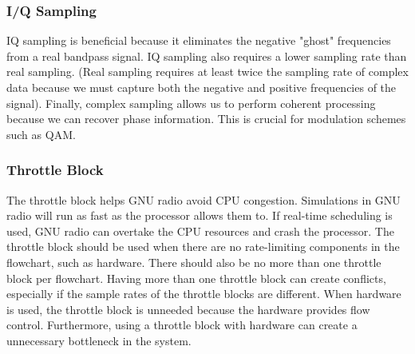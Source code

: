 \documentclass{article}
\begin{document}
	\subsubsection{I/Q Sampling}
	IQ sampling is beneficial because it eliminates the negative "ghost" frequencies from a real bandpass signal. IQ sampling also requires a lower sampling rate than real sampling. (Real sampling requires at least twice the sampling rate of complex data because we must capture both the negative and positive frequencies of the signal). Finally, complex sampling allows us to perform coherent processing because we can recover phase information. This is crucial for modulation schemes such as QAM.
	

	\subsubsection{Throttle Block}
	The throttle block helps GNU radio avoid CPU congestion. Simulations in GNU radio will run as fast as the processor allows them to. If real-time scheduling is used, GNU radio can overtake the CPU resources and crash the processor. The throttle block should be used when there are no rate-limiting components in the flowchart, such as hardware. There should also be no more than one throttle block per flowchart. Having more than one throttle block can create conflicts, especially if the sample rates of the throttle blocks are different. When hardware is used, the throttle block is unneeded because the hardware provides flow control. Furthermore, using a throttle block with hardware can create a unnecessary bottleneck in the system.
		
		
	
\end{document}
